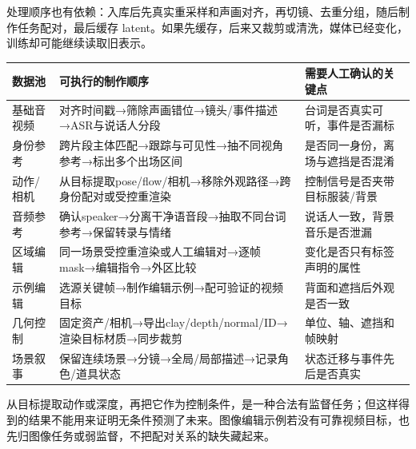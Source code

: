 处理顺序也有依赖：入库后先真实重采样和声画对齐，再切镜、去重分组，随后制作任务配对，最后缓存 latent。如果先缓存，后来又裁剪或清洗，媒体已经变化，训练却可能继续读取旧表示。

{\def\LTcaptype{table} %
\small\setlength{\tabcolsep}{3pt}\renewcommand{\arraystretch}{1.18}
\begin{longtable}[]{@{}
  >{\raggedright\arraybackslash}p{}
  >{\raggedright\arraybackslash}p{}
  >{\raggedright\arraybackslash}p{}@{}}
\toprule\noalign{}
\begin{minipage}[b]{\linewidth}\raggedright
数据池
\end{minipage} & \begin{minipage}[b]{\linewidth}\raggedright
可执行的制作顺序
\end{minipage} & \begin{minipage}[b]{\linewidth}\raggedright
需要人工确认的关键点
\end{minipage} \\
\midrule\noalign{}
\endhead
\bottomrule\noalign{}
\endlastfoot
基础音视频 & 对齐时间戳→筛除声画错位→镜头/事件描述→ASR与说话人分段 & 台词是否真实可听，事件是否漏标 \\
身份参考 & 跨片段主体匹配→跟踪与可见性→抽不同视角参考→标出多个出场区间 & 是否同一身份，离场与遮挡是否混淆 \\
动作/相机 & 从目标提取pose/flow/相机→移除外观路径→跨身份配对或受控重渲染 & 控制信号是否夹带目标服装/背景 \\
音频参考 & 确认speaker→分离干净语音段→抽取不同台词参考→保留转录与情绪 & 说话人一致，背景音乐是否泄漏 \\
区域编辑 & 同一场景受控重渲染或人工编辑对→逐帧mask→编辑指令→外区比较 & 变化是否只有标签声明的属性 \\
示例编辑 & 选源关键帧→制作编辑示例→配可验证的视频目标 & 背面和遮挡后外观是否一致 \\
几何控制 & 固定资产/相机→导出clay/depth/normal/ID→渲染目标材质→同步裁剪 & 单位、轴、遮挡和帧映射 \\
场景叙事 & 保留连续场景→分镜→全局/局部描述→记录角色/道具状态 & 状态迁移与事件先后是否真实 \\
\end{longtable}
}

从目标提取动作或深度，再把它作为控制条件，是一种合法有监督任务；但这样得到的结果不能用来证明无条件预测了未来。图像编辑示例若没有可靠视频目标，也先归图像任务或弱监督，不把配对关系的缺失藏起来。

